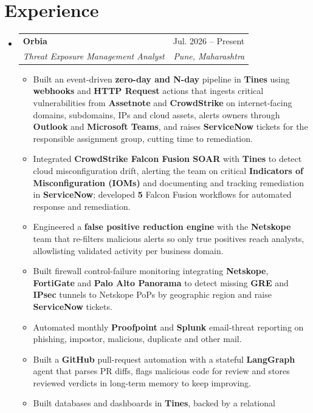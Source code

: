 \documentclass[a4paper,10pt]{article}
\makeatletter
\newcommand{\resumeItem}[1]{
  \item\small{
    {#1 \vspace{-2pt}}
  }
}
\newcommand{\resumeSubheading}[4]{
  \vspace{-2pt}\item
  \begin{tabular*}{0.97\textwidth}[t]{l@{\extracolsep{\fill}}r}
    \textbf{#1} & #2 \\
    \textit{\small#3} & \textit{\small #4} \\
  \end{tabular*}\vspace{-3pt}
}
\newenvironment{resumeSubHeadingList}{\begin{itemize}[leftmargin=0.15in, label={}]}{\end{itemize}}
\newenvironment{resumeItemList}{\begin{itemize}}{\end{itemize}}
\makeatother
\begin{document}
\section{Experience}
\begin{resumeSubHeadingList}

  \resumeSubheading
    {Orbia}{Jul. 2026 -- Present}
    {Threat Exposure Management Analyst}{Pune, Maharashtra}
    \begin{resumeItemList}
      \resumeItem{Built an event-driven \textbf{zero-day and N-day} pipeline in \textbf{Tines}
                   using \textbf{webhooks} and \textbf{HTTP Request} actions that ingests critical vulnerabilities from \textbf{Assetnote} and \textbf{CrowdStrike}
                   on internet-facing domains, subdomains, IPs and cloud assets,
                   alerts owners through \textbf{Outlook} and \textbf{Microsoft Teams}, and raises \textbf{ServiceNow} tickets for the responsible assignment group,
                   cutting time to remediation.}
      \resumeItem{Integrated \textbf{CrowdStrike Falcon Fusion SOAR} with \textbf{Tines} to detect cloud
                   misconfiguration drift, alerting the team on critical
                   \textbf{Indicators of Misconfiguration (IOMs)} and documenting and
                   tracking remediation in \textbf{ServiceNow}; developed
                   \textbf{5} Falcon Fusion workflows for automated response and
                   remediation.}
      \resumeItem{Engineered a \textbf{false positive reduction engine} with the \textbf{Netskope}
                   team that re-filters malicious alerts so only true positives
                   reach analysts, allowlisting validated activity per business
                   domain.}
      \resumeItem{Built firewall control-failure monitoring integrating \textbf{Netskope}, \textbf{FortiGate} and
                   \textbf{Palo Alto Panorama} to detect missing \textbf{GRE} and \textbf{IPsec} tunnels to
                   Netskope PoPs by geographic region and raise \textbf{ServiceNow}
                   tickets.}
      \resumeItem{Automated monthly \textbf{Proofpoint} and \textbf{Splunk} email-threat reporting on
                   phishing, impostor, malicious, duplicate and other mail.}
      \resumeItem{Built a \textbf{GitHub} pull-request automation with a stateful \textbf{LangGraph}
                   agent that parses PR diffs, flags malicious code for review and
                   stores reviewed verdicts in long-term memory to keep improving.}
      \resumeItem{Built databases and dashboards in \textbf{Tines}, backed by a relational
}
\end{resumeItemList}
\end{resumeSubHeadingList}
\end{document}
